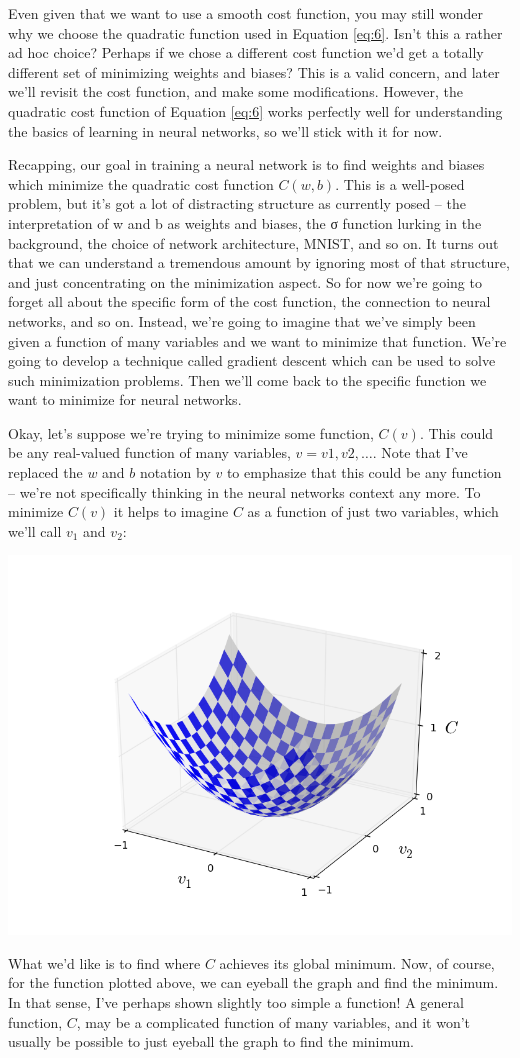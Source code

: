 \documentclass[a4paper,twoside,10pt]{book}
\begin{document}
Even given that we want to use a smooth cost function, you may still wonder why we choose the quadratic function used in Equation \ref{eq:6}. Isn't this a rather ad hoc choice? Perhaps if we chose a different cost function we'd get a totally different set of minimizing weights and biases? This is a valid concern, and later we'll revisit the cost function, and make some modifications. However, the quadratic cost function of Equation \ref{eq:6} works perfectly well for understanding the basics of learning in neural networks, so we'll stick with it for now.

Recapping, our goal in training a neural network is to find weights and biases which minimize the quadratic cost function $C(w,b)$. This is a well-posed problem, but it's got a lot of distracting structure as currently posed -- the interpretation of w and b as weights and biases, the σ function lurking in the background, the choice of network architecture, MNIST, and so on. It turns out that we can understand a tremendous amount by ignoring most of that structure, and just concentrating on the minimization aspect. So for now we're going to forget all about the specific form of the cost function, the connection to neural networks, and so on. Instead, we're going to imagine that we've simply been given a function of many variables and we want to minimize that function. We're going to develop a technique called gradient descent which can be used to solve such minimization problems. Then we'll come back to the specific function we want to minimize for neural networks.

Okay, let's suppose we're trying to minimize some function, $C(v)$. This could be any real-valued function of many variables, $v=v1,v2,\ldots$. Note that I've replaced the $w$ and $b$ notation by $v$ to emphasize that this could be any function -- we're not specifically thinking in the neural networks context any more. To minimize $C(v)$ it helps to imagine $C$ as a function of just two variables, which we'll call $v_1$ and $v_2$:
\begin{center}
	\includegraphics[width=0.5\linewidth]{./figures/ch1/valley}
\end{center}
What we'd like is to find where $C$ achieves its global minimum. Now, of course, for the function plotted above, we can eyeball the graph and find the minimum. In that sense, I've perhaps shown slightly too simple a function! A general function, $C$, may be a complicated function of many variables, and it won't usually be possible to just eyeball the graph to find the minimum.
\end{document}
